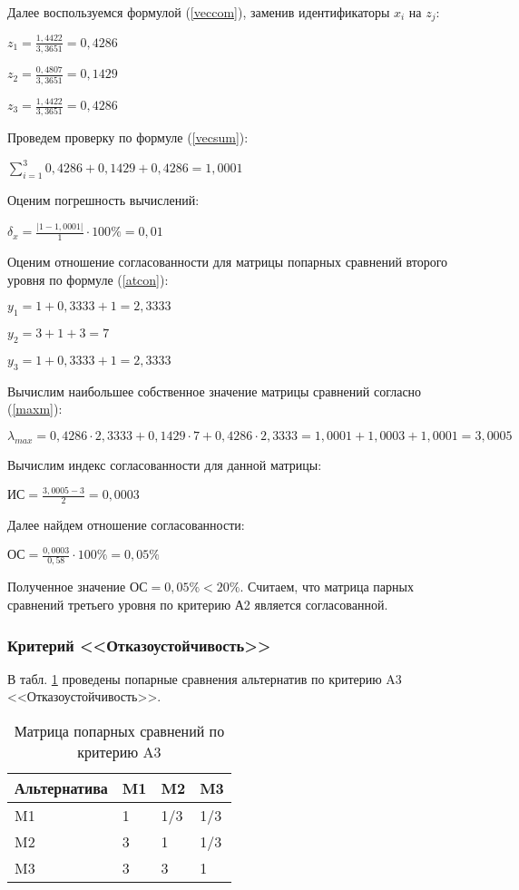 Далее воспользуемся формулой (\ref{veccom}), заменив идентификаторы $x_i$ на $z_j$:

$z_1 = \frac{1,4422}{3,3651} = 0,4286$

$z_2 = \frac{0,4807}{3,3651} = 0,1429$

$z_3 = \frac{1,4422}{3,3651} = 0,4286$

Проведем проверку по формуле (\ref{vecsum}):

$\sum_{i=1}^{3} 0,4286 + 0,1429 + 0,4286 = 1,0001$

Оценим погрешность вычислений:

$\delta_{x} = \frac{|1 - 1,0001|}{1} \cdot 100\% = 0,01$

Оценим отношение согласованности для матрицы попарных сравнений второго уровня по формуле (\ref{atcon}):

$y_1 = 1 + 0,3333 + 1 = 2,3333$

$y_2 = 3 + 1 + 3 = 7$

$y_3 = 1 + 0,3333 + 1 = 2,3333$

Вычислим наибольшее собственное значение матрицы сравнений согласно (\ref{maxm}):

$\lambda_{max} = 0,4286 \cdot 2,3333 + 0,1429 \cdot 7 + 0,4286 \cdot 2,3333 = 1,0001 + 1,0003 + 1,0001 = 3,0005$

Вычислим индекс согласованности для данной матрицы:

$\text{ИС} = \frac{3,0005 - 3}{2} = 0,0003$

Далее найдем отношение согласованности:

$\text{ОС} = \frac{0,0003}{0,58} \cdot 100\% = 0,05\%$

Полученное значение $\text{ОС} = 0,05\% < 20\%$.
Считаем, что матрица парных сравнений третьего уровня по критерию А2 является согласованной.

\subsubsection{Критерий <<Отказоустойчивость>>}

В табл. \ref{fat} проведены попарные сравнения альтернатив по критерию A3 <<Отказоустойчивость>>.
\begin{table}[H]
  \caption{Матрица попарных сравнений по критерию A3}\label{fat}
  \begin{tabular}{|l|l|l|l|}
  \hline Альтернатива & M1 & M2 & M3 \\
  \hline M1 & 1 & 1/3 & 1/3 \\
  \hline M2 & 3 & 1 & 1/3 \\
  \hline M3 & 3 & 3 & 1 \\
  \hline
  \end{tabular}
\end{table}

